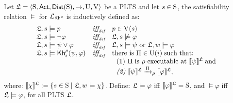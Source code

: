 \begin{definition} \label{def:semantics}
    Let $\model = \tup{\S,\ACT,\dist(\S),\ra,\Unc,\V}$ be a PLTS and let $s\in\S$, the satisfiability relation $\models$ for $\PKh$ is inductively defined as:
    \[
    \begin{array}{l@{\ \ \ }c@{\ \ \  }l}
    \model, s \models p & \iffdef & p \in \V(s) \\
    \model, s\models \neg\varphi & \iffdef & \model, s \not\models \varphi \\
    \model, s \models \psi\vee\varphi & \iffdef & \model, s \models \psi \mbox{ or }\model, w \models \varphi \\
    \model, s \models \kh_i^\rho(\psi,\varphi) & \iffdef & \text{there is } \plans \in \Unc(i) \;\text{such that:} \\
    & & \ \ \text{\rm (1)} \ \plans \text{ is $\rho$-executable at }  \truthset{\model}{\psi}\; \text{and} \\
    & & \ \ \text{\em (2)} \ \truthset{\model}{\psi} \reach{\plans}_\rho \truthset{\model}{\varphi}, 
    \end{array}
    \]     
    where: $\truthset{\model}{\chi} := \csetsc{s\in\S}{\model,w\models\chi}$. Define: $\model\models\varphi$ iff  $\truthset{\model}{\varphi}=\S$, and $\models\varphi$ iff $\model\models\varphi$, for all PLTS $\model$.
\end{definition}